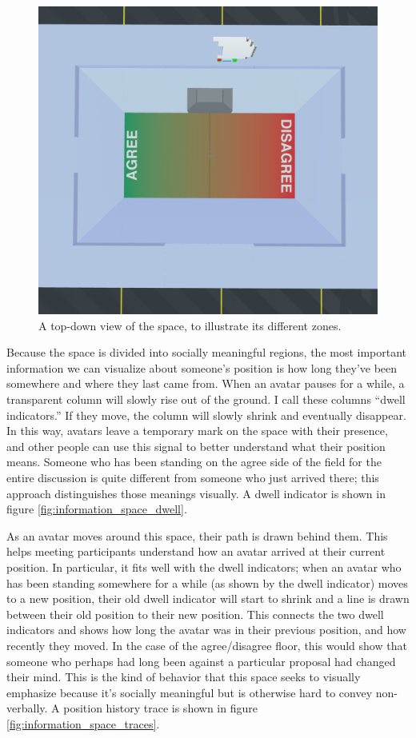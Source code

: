 \begin{figure}[t]
	\includegraphics{figures/layout.png}
	\caption{A top-down view of the space, to illustrate its different zones.}
	\label{fig:information_space_layout}
\end{figure}

Because the space is divided into socially meaningful regions, the most important information we can visualize about someone's position is how long they've been somewhere and where they last came from. When an avatar pauses for a while, a transparent column will slowly rise out of the ground. I call these columns ``dwell indicators.'' If they move, the column will slowly shrink and eventually disappear. In this way, avatars leave a temporary mark on the space with their presence, and other people can use this signal to better understand what their position means. Someone who has been standing on the agree side of the field for the entire discussion is quite different from someone who just arrived there; this approach distinguishes those meanings visually. A dwell indicator is shown in figure \ref{fig:information_space_dwell}.

As an avatar moves around this space, their path is drawn behind them. This helps meeting participants understand how an avatar arrived at their current position. In particular, it fits well with the dwell indicators; when an avatar who has been standing somewhere for a while (as shown by the dwell indicator) moves to a new position, their old dwell indicator will start to shrink and a line is drawn between their old position to their new position. This connects the two dwell indicators and shows how long the avatar was in their previous position, and how recently they moved. In the case of the agree/disagree floor, this would show that someone who perhaps had long been against a particular proposal had changed their mind. This is the kind of behavior that this space seeks to visually emphasize because it's socially meaningful but is otherwise hard to convey non-verbally. A position history trace is shown in figure \ref{fig:information_space_traces}.

